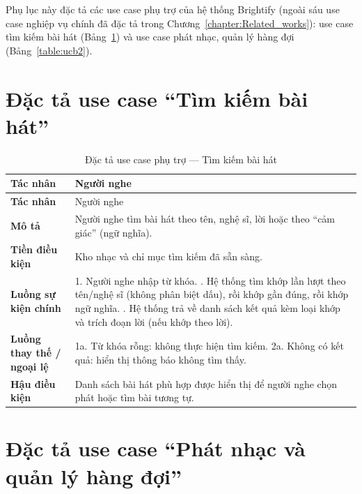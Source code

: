 \documentclass[../DoAn.tex]{subfiles}
\begin{document}
\label{appendix:usecase}
Phụ lục này đặc tả các use case phụ trợ của hệ thống Brightify (ngoài sáu use case nghiệp vụ chính đã đặc tả trong Chương~\ref{chapter:Related_works}): use case tìm kiếm bài hát (Bảng~\ref{table:ucb1}) và use case phát nhạc, quản lý hàng đợi (Bảng~\ref{table:ucb2}).

\section{Đặc tả use case ``Tìm kiếm bài hát''}

\begin{longtable}{|p{3.0cm}|p{11.0cm}|}
\caption{Đặc tả use case phụ trợ --- Tìm kiếm bài hát}\label{table:ucb1}\\
\hline
\textbf{Tác nhân} & Người nghe \\
\hline
\endfirsthead
\hline
\textbf{Tác nhân} & Người nghe \\
\hline
\endhead
\textbf{Mô tả} & Người nghe tìm bài hát theo tên, nghệ sĩ, lời hoặc theo ``cảm giác'' (ngữ nghĩa). \\ \hline
\textbf{Tiền điều kiện} & Kho nhạc và chỉ mục tìm kiếm đã sẵn sàng. \\ \hline
\textbf{Luồng sự kiện chính} & 1. Người nghe nhập từ khóa. \newline 2. Hệ thống tìm khớp lần lượt theo tên/nghệ sĩ (không phân biệt dấu), rồi khớp gần đúng, rồi khớp ngữ nghĩa. \newline 3. Hệ thống trả về danh sách kết quả kèm loại khớp và trích đoạn lời (nếu khớp theo lời). \\ \hline
\textbf{Luồng thay thế / ngoại lệ} & 1a. Từ khóa rỗng: không thực hiện tìm kiếm. \newline 2a. Không có kết quả: hiển thị thông báo không tìm thấy. \\ \hline
\textbf{Hậu điều kiện} & Danh sách bài hát phù hợp được hiển thị để người nghe chọn phát hoặc tìm bài tương tự. \\ \hline
\end{longtable}

\section{Đặc tả use case ``Phát nhạc và quản lý hàng đợi''}
\end{document}
